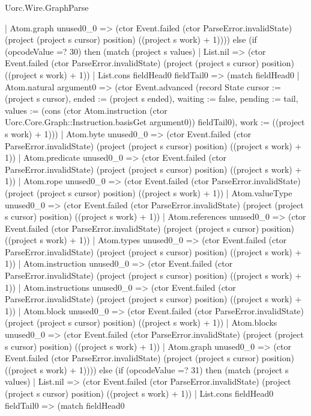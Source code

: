 \begin{lexlean}{Uorc.Wire.GraphParse}
\begin{semanticmodule}
{          | Atom.graph unused0_0 => (ctor Event.failed (ctor ParseError.invalidState) (project (project s cursor) position) ((project s work) + 1)))) else (if (opcodeValue =? 30) then (match (project s values)
        | List.nil => (ctor Event.failed (ctor ParseError.invalidState) (project (project s cursor) position) ((project s work) + 1))
        | List.cons fieldHead0 fieldTail0 => (match fieldHead0
          | Atom.natural argument0 => (ctor Event.advanced (record State {cursor := (project s cursor), ended := (project s ended), waiting := false, pending := tail, values := (cons (ctor Atom.instruction (ctor Uorc.Core.Graph::Instruction.basisGet argument0)) fieldTail0), work := ((project s work) + 1)}))
          | Atom.byte unused0_0 => (ctor Event.failed (ctor ParseError.invalidState) (project (project s cursor) position) ((project s work) + 1))
          | Atom.predicate unused0_0 => (ctor Event.failed (ctor ParseError.invalidState) (project (project s cursor) position) ((project s work) + 1))
          | Atom.rope unused0_0 => (ctor Event.failed (ctor ParseError.invalidState) (project (project s cursor) position) ((project s work) + 1))
          | Atom.valueType unused0_0 => (ctor Event.failed (ctor ParseError.invalidState) (project (project s cursor) position) ((project s work) + 1))
          | Atom.references unused0_0 => (ctor Event.failed (ctor ParseError.invalidState) (project (project s cursor) position) ((project s work) + 1))
          | Atom.types unused0_0 => (ctor Event.failed (ctor ParseError.invalidState) (project (project s cursor) position) ((project s work) + 1))
          | Atom.instruction unused0_0 => (ctor Event.failed (ctor ParseError.invalidState) (project (project s cursor) position) ((project s work) + 1))
          | Atom.instructions unused0_0 => (ctor Event.failed (ctor ParseError.invalidState) (project (project s cursor) position) ((project s work) + 1))
          | Atom.block unused0_0 => (ctor Event.failed (ctor ParseError.invalidState) (project (project s cursor) position) ((project s work) + 1))
          | Atom.blocks unused0_0 => (ctor Event.failed (ctor ParseError.invalidState) (project (project s cursor) position) ((project s work) + 1))
          | Atom.graph unused0_0 => (ctor Event.failed (ctor ParseError.invalidState) (project (project s cursor) position) ((project s work) + 1)))) else (if (opcodeValue =? 31) then (match (project s values)
        | List.nil => (ctor Event.failed (ctor ParseError.invalidState) (project (project s cursor) position) ((project s work) + 1))
        | List.cons fieldHead0 fieldTail0 => (match fieldHead0
}
\end{semanticmodule}
\end{lexlean}

